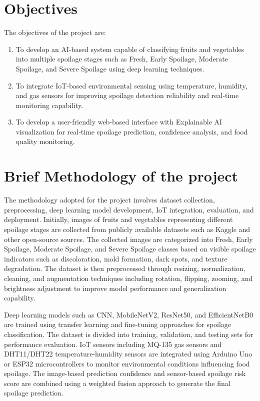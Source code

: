 \section[Objectives]{\textbf{Objectives}}
The objectives of the project are:
\begin{enumerate}
\item To develop an AI-based system capable of classifying fruits and vegetables into multiple spoilage stages such as Fresh, Early Spoilage, Moderate Spoilage, and Severe Spoilage using deep learning techniques.
\item To integrate IoT-based environmental sensing using temperature, humidity, and gas sensors for improving spoilage detection reliability and real-time monitoring capability.
\item To develop a user-friendly web-based interface with Explainable AI visualization for real-time spoilage prediction, confidence analysis, and food quality monitoring.
\end{enumerate}

\section[Brief Methodology of the project]{\textbf{Brief Methodology of the project}}
The methodology adopted for the project involves dataset collection, preprocessing, deep learning model development, IoT integration, evaluation, and deployment. Initially, images of fruits and vegetables representing different spoilage stages are collected from publicly available datasets such as Kaggle and other open-source sources. The collected images are categorized into Fresh, Early Spoilage, Moderate Spoilage, and Severe Spoilage classes based on visible spoilage indicators such as discoloration, mold formation, dark spots, and texture degradation. The dataset is then preprocessed through resizing, normalization, cleaning, and augmentation techniques including rotation, flipping, zooming, and brightness adjustment to improve model performance and generalization capability.

Deep learning models such as CNN, MobileNetV2, ResNet50, and EfficientNetB0 are trained using transfer learning and fine-tuning approaches for spoilage classification. The dataset is divided into training, validation, and testing sets for performance evaluation. IoT sensors including MQ-135 gas sensors and DHT11/DHT22 temperature-humidity sensors are integrated using Arduino Uno or ESP32 microcontrollers to monitor environmental conditions influencing food spoilage. The image-based prediction confidence and sensor-based spoilage risk score are combined using a weighted fusion approach to generate the final spoilage prediction.

